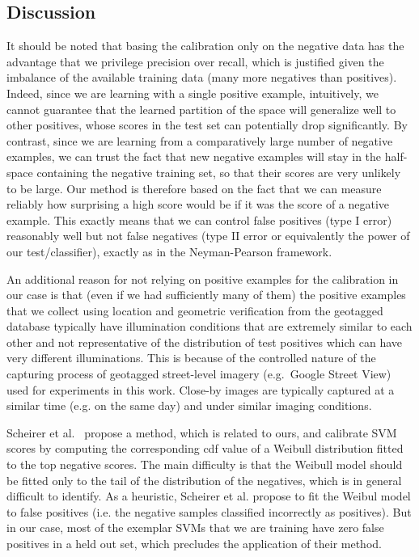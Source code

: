    \subsection{Discussion}
   \label{sec:discussion}
      It should be noted that basing the calibration only on the negative data has the advantage that we privilege precision over recall, which is justified given the imbalance of the available training data (many more negatives than positives).
      Indeed, since we are learning with a single positive example, intuitively, we cannot guarantee that the learned partition of the space will generalize well to other positives, whose scores in the test set can potentially drop significantly. %
      By contrast, since we are learning from a comparatively large number of negative examples, we can trust the fact that new negative examples will stay in the half-space containing the negative training set, so that their scores are very unlikely to be large. Our method is therefore based on the fact that we can measure reliably how surprising a high score would be if it was the score of a negative example. This exactly means that we can control false positives (type I error) reasonably well but not false negatives (type II error or equivalently the power of our test/classifier), exactly as in the Neyman-Pearson framework.

      An additional reason for not relying on positive examples for the calibration in our case is that (even if we had sufficiently many of them) the positive examples that we collect using location and geometric verification from the geotagged database typically have illumination conditions that are extremely similar to each other and not representative of the distribution of test positives which can have very different illuminations. This is because of the controlled nature of the capturing process of geotagged street-level imagery (e.g.\ Google Street View) used for experiments in this work. Close-by images are typically captured at a similar time (e.g. on the same day) and under similar imaging conditions.

      Scheirer et al.~\cite{Scheirer12} propose a method, which is related to ours, and calibrate SVM scores by computing the corresponding cdf value of a Weibull distribution fitted to the top negative scores. The main difficulty is that the Weibull model should be fitted only to the tail of the distribution of the negatives, which is in general difficult to identify. As a heuristic, Scheirer et al. propose to fit the Weibul model to false positives (i.e. the negative samples classified incorrectly as positives). But in our case, most of the exemplar SVMs that we are training have zero false positives in a held out set, which precludes the application of their method. 


